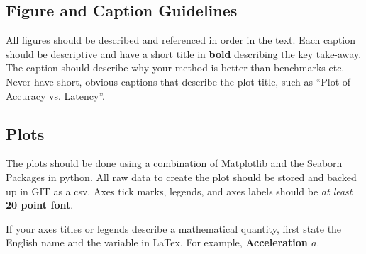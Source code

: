 \subsection{Figure and Caption Guidelines}

All figures should be described and referenced in order in the text. 
Each caption should be descriptive and have a short title in \textbf{bold} describing the key take-away. The caption should describe why your method is better than benchmarks etc. Never have short, obvious captions that describe the plot title, such as ``Plot of Accuracy vs. Latency''.

\subsection{Plots}

The plots should be done using a combination of Matplotlib and the Seaborn Packages in python. All raw data to create the plot should be stored and backed up in GIT as a csv. Axes tick marks, legends, and axes labels should be \textit{at least} \textbf{20 point font}.

If your axes titles or legends describe a mathematical quantity, first state the English name and the variable in LaTex. For example, \textbf{Acceleration $a$}. 
